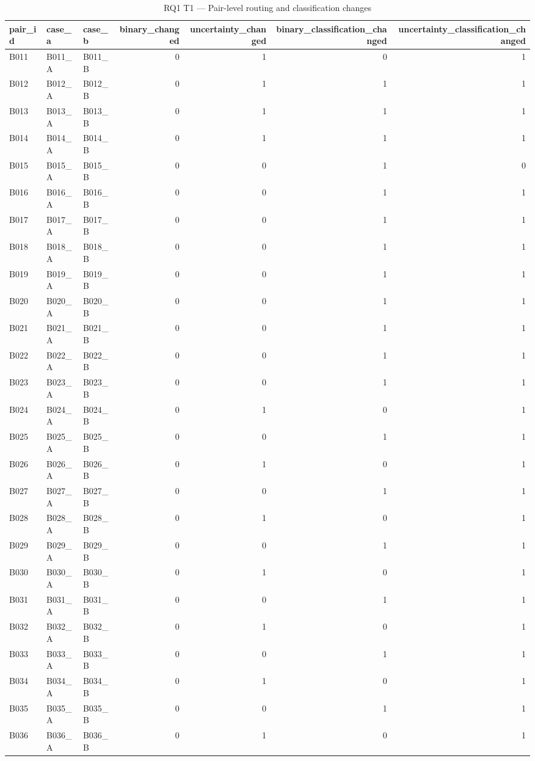 \begin{table}
\caption{RQ1 T1 — Pair-level routing and classification changes}
\label{tab:rq1_t1_pair_action_changes}
\begin{tabular}{lllrrrr}
\toprule
pair\_id & case\_a & case\_b & binary\_changed & uncertainty\_changed & binary\_classification\_changed & uncertainty\_classification\_changed \\
\midrule
B011 & B011\_A & B011\_B & 0 & 1 & 0 & 1 \\
B012 & B012\_A & B012\_B & 0 & 1 & 1 & 1 \\
B013 & B013\_A & B013\_B & 0 & 1 & 1 & 1 \\
B014 & B014\_A & B014\_B & 0 & 1 & 1 & 1 \\
B015 & B015\_A & B015\_B & 0 & 0 & 1 & 0 \\
B016 & B016\_A & B016\_B & 0 & 0 & 1 & 1 \\
B017 & B017\_A & B017\_B & 0 & 0 & 1 & 1 \\
B018 & B018\_A & B018\_B & 0 & 0 & 1 & 1 \\
B019 & B019\_A & B019\_B & 0 & 0 & 1 & 1 \\
B020 & B020\_A & B020\_B & 0 & 0 & 1 & 1 \\
B021 & B021\_A & B021\_B & 0 & 0 & 1 & 1 \\
B022 & B022\_A & B022\_B & 0 & 0 & 1 & 1 \\
B023 & B023\_A & B023\_B & 0 & 0 & 1 & 1 \\
B024 & B024\_A & B024\_B & 0 & 1 & 0 & 1 \\
B025 & B025\_A & B025\_B & 0 & 0 & 1 & 1 \\
B026 & B026\_A & B026\_B & 0 & 1 & 0 & 1 \\
B027 & B027\_A & B027\_B & 0 & 0 & 1 & 1 \\
B028 & B028\_A & B028\_B & 0 & 1 & 0 & 1 \\
B029 & B029\_A & B029\_B & 0 & 0 & 1 & 1 \\
B030 & B030\_A & B030\_B & 0 & 1 & 0 & 1 \\
B031 & B031\_A & B031\_B & 0 & 0 & 1 & 1 \\
B032 & B032\_A & B032\_B & 0 & 1 & 0 & 1 \\
B033 & B033\_A & B033\_B & 0 & 0 & 1 & 1 \\
B034 & B034\_A & B034\_B & 0 & 1 & 0 & 1 \\
B035 & B035\_A & B035\_B & 0 & 0 & 1 & 1 \\
B036 & B036\_A & B036\_B & 0 & 1 & 0 & 1 \\

\end{tabular}
\end{table}
